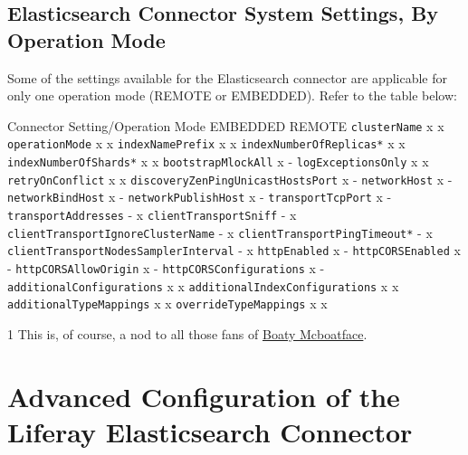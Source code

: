 \section{Elasticsearch Connector System Settings, By Operation
Mode}\label{elasticsearch-connector-system-settings-by-operation-mode}

Some of the settings available for the Elasticsearch connector are
applicable for only one operation mode (REMOTE or EMBEDDED). Refer to
the table below:

Connector Setting/Operation Mode \textbar{} EMBEDDED \textbar{} REMOTE
\textbar{} \texttt{clusterName} \textbar{} x \textbar{} x
\texttt{operationMode} \textbar{} x \textbar{} x
\texttt{indexNamePrefix} \textbar{} x \textbar{} x
\texttt{indexNumberOfReplicas*} \textbar{} x \textbar{} x
\texttt{indexNumberOfShards*} \textbar{} x \textbar{} x
\texttt{bootstrapMlockAll} \textbar{} x \textbar{} -
\texttt{logExceptionsOnly} \textbar{} x \textbar{} x
\texttt{retryOnConflict} \textbar{} x \textbar{} x
\texttt{discoveryZenPingUnicastHostsPort} \textbar{} x \textbar{} -
\texttt{networkHost} \textbar{} x \textbar{} - \texttt{networkBindHost}
\textbar{} x \textbar{} - \texttt{networkPublishHost} \textbar{} x
\textbar{} - \texttt{transportTcpPort} \textbar{} x \textbar{} -
\texttt{transportAddresses} \textbar{} - \textbar{} x
\texttt{clientTransportSniff} \textbar{} - \textbar{} x
\texttt{clientTransportIgnoreClusterName} \textbar{} - \textbar{} x
\texttt{clientTransportPingTimeout*} \textbar{} - \textbar{} x
\texttt{clientTransportNodesSamplerInterval} \textbar{} - \textbar{} x
\texttt{httpEnabled} \textbar{} x \textbar{} - \texttt{httpCORSEnabled}
\textbar{} x \textbar{} - \texttt{httpCORSAllowOrigin} \textbar{} x
\textbar{} - \texttt{httpCORSConfigurations} \textbar{} x \textbar{} -
\texttt{additionalConfigurations} \textbar{} x \textbar{} x
\texttt{additionalIndexConfigurations} \textbar{} x \textbar{} x
\texttt{additionalTypeMappings} \textbar{} x \textbar{} x
\texttt{overrideTypeMappings} \textbar{} x \textbar{} x

1 This is, of course, a nod to all those fans of
\href{http://www.theatlantic.com/international/archive/2016/05/boaty-mcboatface-parliament-lessons/482046}{Boaty
Mcboatface}.

\chapter{Advanced Configuration of the Liferay Elasticsearch
Connector}\label{advanced-configuration-of-the-liferay-elasticsearch-connector}

